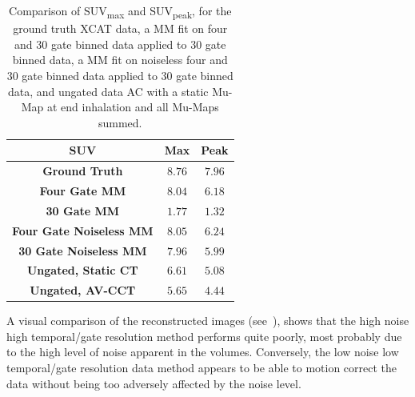             \begin{table}
                \centering
                
                \captionsetup{singlelinecheck=false, justification=centering}
                \caption{
                    Comparison of \gls{SUV}\textsubscript{max} and \gls{SUV}\textsubscript{peak}, for the ground truth \gls{XCAT} data, a \gls{MM} fit on four and $30$ gate binned data applied to $30$ gate binned data, a \gls{MM} fit on noiseless four and $30$ gate binned data applied to $30$ gate binned data, and ungated data \gls{AC} with a static \gls{Mu-Map} at end inhalation and all \glspl{Mu-Map} summed.
                }
                
                \resizebox*{1.0\linewidth}{!}
                {
                    \begin{tabular}{||c|cc||}
                        \hline
                        \textbf{SUV}                            & \textbf{Max}  & \textbf{Peak} \\
                        \hline
                        \textbf{Ground Truth}                   & $8.76$        & $7.96$ \\
                        \hline
                        \textbf{Four Gate MM}                   & $8.04$        & $6.18$ \\
                        \textbf{30 Gate MM}                     & $1.77$        & $1.32$ \\
                        \hline
                        \textbf{Four Gate Noiseless \gls{MM}}   & $8.05$        & $6.24$ \\
                        \textbf{30 Gate Noiseless \gls{MM}}     & $7.96$        & $5.99$ \\
                        \hline
                        \textbf{Ungated, Static CT}             & $6.61$        & $5.08$ \\
                        \textbf{Ungated, AV-CCT}                & $5.65$        & $4.44$ \\
                        \hline
                    \end{tabular}
                }
                \label{tab:pet_ct_motion_correction_exploiting_motion_models_fit_on_coarsely_gated_data_applied_to_finely_gated_data_results_suv}
            \end{table}
            
            A visual comparison of the reconstructed images (see~), shows that the high noise high temporal/gate resolution method performs quite poorly, most probably due to the high level of noise apparent in the volumes. Conversely, the low noise low temporal/gate resolution data method appears to be able to motion correct the data without being too adversely affected by the noise level.
             
